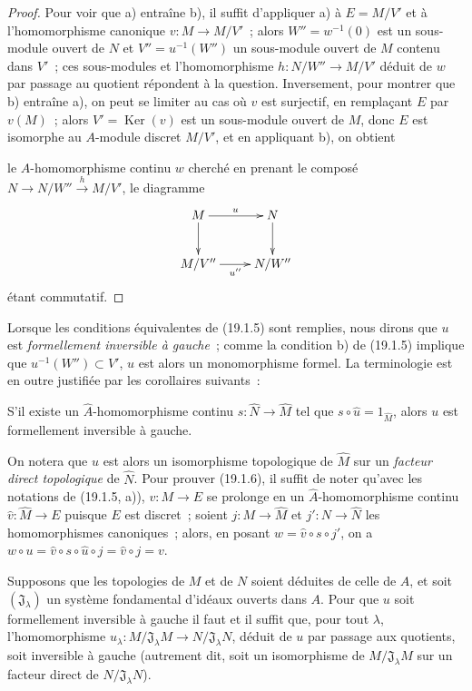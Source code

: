 \begin{proof}
Pour voir que a) entraîne b), il suffit d'appliquer a) à $E=M/V'$ et à
l'homomorphisme canonique $v:M\to M/V'$~; alors $W''=w^{-1}(0)$ est un
sous-module ouvert de $N$ et $V''=u^{-1}(W'')$ un sous-module ouvert de $M$
contenu dans $V'$~; ces sous-modules et l'homomorphisme
$h:N/W''\to M/V'$ déduit de $w$ par passage au quotient répondent à la
question. Inversement, pour montrer que b) entraîne a), on peut se limiter au
cas où $v$ est surjectif, en remplaçant $E$ par $v(M)$~; alors
$V'=\operatorname{Ker}(v)$ est un sous-module ouvert de $M$, donc $E$ est
isomorphe au $A$-module discret $M/V'$, et en appliquant b), on obtient


le $A$-homomorphisme continu $w$ cherché en prenant le composé
$N\to N/W''\xrightarrow{h}M/V'$, le diagramme
\[
  \xymatrix{
    M\ar[r]^u\ar[d] & N\ar[d]\\
    M/V''\ar[r]_{u''} & N/W''
  }
\]
étant commutatif.
\end{proof}

Lorsque les conditions équivalentes de (19.1.5) sont remplies, nous dirons que
$u$ est \emph{formellement inversible à gauche}~; comme la condition b) de
(19.1.5) implique que $u^{-1}(W'')\subset V'$, $u$ est alors un monomorphisme
formel. La terminologie est en outre justifiée par les corollaires suivants~:

\begin{corollary}[19.1.6]
\label{0.19.1.6-fr}
S'il existe un $\widehat A$-homomorphisme continu
$s:\widehat N\to\widehat M$ tel que
$s\circ\widehat u=1_{\widehat M}$, alors $u$ est formellement inversible à
gauche.
\end{corollary}

On notera que $\widehat u$ est alors un isomorphisme topologique de
$\widehat M$ sur un \emph{facteur direct topologique} de $\widehat N$. Pour
prouver (19.1.6), il suffit de noter qu'avec les notations de (19.1.5, a)),
$v:M\to E$ se prolonge en un $\widehat A$-homomorphisme continu
$\widehat v:\widehat M\to E$ puisque $E$ est discret~; soient
$j:M\to\widehat M$ et $j':N\to\widehat N$ les homomorphismes canoniques~;
alors, en posant $w=\widehat v\circ s\circ j'$, on a
$w\circ u=\widehat v\circ s\circ\widehat u\circ j=\widehat v\circ j=v$.

\begin{corollary}[19.1.7]
\label{0.19.1.7-fr}
Supposons que les topologies de $M$ et de $N$ soient déduites de celle de $A$,
et soit $(\mathfrak J_\lambda)$ un système fondamental d'idéaux ouverts dans
$A$. Pour que $u$ soit formellement inversible à gauche il faut et il suffit
que, pour tout $\lambda$, l'homomorphisme
$u_\lambda:M/\mathfrak J_\lambda M\to N/\mathfrak J_\lambda N$, déduit de
$u$ par passage aux quotients, soit inversible à gauche (autrement dit, soit
un isomorphisme de $M/\mathfrak J_\lambda M$ sur un facteur direct de
$N/\mathfrak J_\lambda N$).
\end{corollary}

